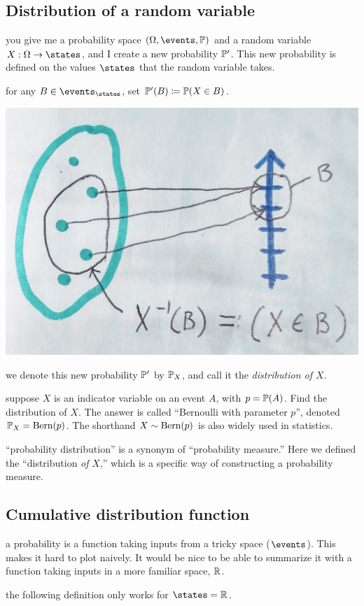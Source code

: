 \documentclass{article}
\begin{document}
\subsection{Distribution of a random variable}\label{sec:distribution}

 you give me a probability space $(\Omega, \events, \P)$ and a random variable $X : \Omega \to \states$, and I create a new probability $\P'$. This new probability is defined on the values $\states$ that the random variable takes.

 for any $B \in \events_\states$, set $\P'(B) \defeq \P(X \in B)$.
\begin{center}
	\includegraphics[width=0.5\linewidth]{figures/inverse}
\end{center}

 we denote this new probability $\P'$ by $\P_X$, and call it the \emph{distribution of $X$}.

 suppose $X$ is an indicator variable on an event $A$, with $p = \P(A)$. Find the distribution of $X$. The answer is called ``Bernoulli with parameter $p$'', denoted $\P_X = \Bern(p)$. The shorthand $X \sim \Bern(p)$ is also widely used in statistics. 

 ``probability distribution'' is a synonym of ``probability measure.'' Here we defined the ``distribution \emph{of} $X$,'' which is a specific way of constructing a probability measure.


\subsection{Cumulative distribution function}

 a probability is a function taking inputs from a tricky space ($\events$). This makes it hard to plot naively. It would be nice to be able to summarize it with a function taking inputs in a more familiar space, $\R$.

 the following definition only works for $\states = \R$.
\end{document}
